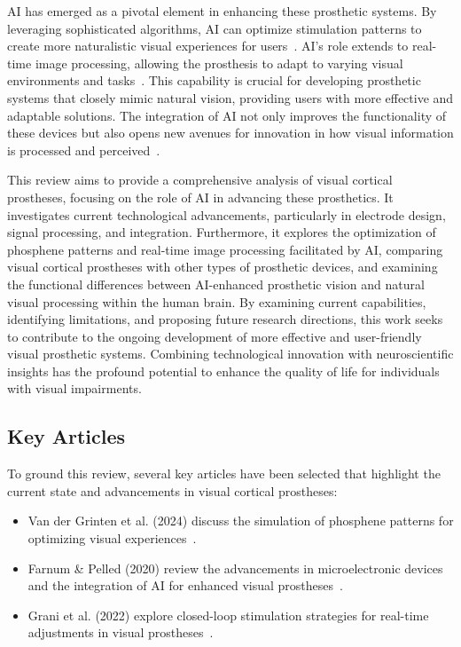\documentclass[twocolumn,10pt]{article}
\begin{document}
AI has emerged as a pivotal element in enhancing these prosthetic systems. By
leveraging sophisticated algorithms, AI can optimize stimulation patterns to
create more naturalistic visual experiences for
users~\parencite{kriegeskorteDeepNeuralNetworks2015}. AI's role extends to real-time
image processing, allowing the prosthesis to adapt to varying visual
environments and tasks~\parencite{marblestoneIntegrationDeepLearning2016}. This
capability is crucial for developing prosthetic systems that closely mimic
natural vision, providing users with more effective and adaptable solutions. The
integration of AI not only improves the functionality of these devices but also
opens new avenues for innovation in how visual information is processed and
perceived~\parencite{gallettiCorticalConnectionsArea2001}.

This review aims to provide a comprehensive analysis of visual cortical
prostheses, focusing on the role of AI in advancing these prosthetics. It
investigates current technological advancements, particularly in electrode
design, signal processing, and integration. Furthermore, it explores the
optimization of phosphene patterns and real-time image processing facilitated by
AI, comparing visual cortical prostheses with other types of prosthetic devices,
and examining the functional differences between AI-enhanced prosthetic vision
and natural visual processing within the human brain. By examining current
capabilities, identifying limitations, and proposing future research directions,
this work seeks to contribute to the ongoing development of more effective and
user-friendly visual prosthetic systems. Combining technological innovation with
neuroscientific insights has the profound potential to enhance the quality of
life for individuals with visual impairments.

\subsection*{Key Articles}\label{sec:key_articles}
To ground this review, several key articles have been selected that highlight
the current state and advancements in visual cortical prostheses:
\begin{itemize}
      \item Van der Grinten et al. (2024) discuss the simulation of phosphene
            patterns for optimizing visual
            experiences~\parencite{vandergrintenBiologicallyPlausiblePhosphene2024}.
      \item Farnum \& Pelled (2020) review the advancements in microelectronic
            devices and the integration of AI for enhanced visual
            prostheses~\parencite{farnumNewVisionVisual2020}.
      \item Grani et al. (2022) explore closed-loop stimulation strategies for
            real-time adjustments in visual
            prostheses~\parencite{graniPersonalizedClosedloopStimulation2022}.
\end{itemize}
\end{document}
